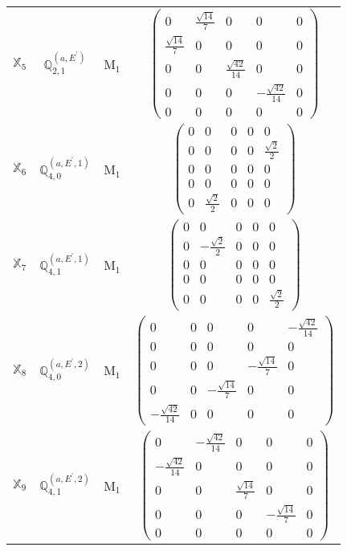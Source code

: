 \documentclass[fleqn,10pt,landscape]{article}
\begin{document}
\begin{itemize}
\begin{center}
\begin{longtable}{c|c|c|c}
$ \mathbb{X}_{5} $ & $\mathbb{Q}_{2,1}^{(a,E^{\prime})}$ & M$_{1}$ & $\begin{pmatrix} 0 & \frac{\sqrt{14}}{7} & 0 & 0 & 0 \\ \frac{\sqrt{14}}{7} & 0 & 0 & 0 & 0 \\ 0 & 0 & \frac{\sqrt{42}}{14} & 0 & 0 \\ 0 & 0 & 0 & - \frac{\sqrt{42}}{14} & 0 \\ 0 & 0 & 0 & 0 & 0 \end{pmatrix}$ \\
$ \mathbb{X}_{6} $ & $\mathbb{Q}_{4,0}^{(a,E^{\prime},1)}$ & M$_{1}$ & $\begin{pmatrix} 0 & 0 & 0 & 0 & 0 \\ 0 & 0 & 0 & 0 & \frac{\sqrt{2}}{2} \\ 0 & 0 & 0 & 0 & 0 \\ 0 & 0 & 0 & 0 & 0 \\ 0 & \frac{\sqrt{2}}{2} & 0 & 0 & 0 \end{pmatrix}$ \\
$ \mathbb{X}_{7} $ & $\mathbb{Q}_{4,1}^{(a,E^{\prime},1)}$ & M$_{1}$ & $\begin{pmatrix} 0 & 0 & 0 & 0 & 0 \\ 0 & - \frac{\sqrt{2}}{2} & 0 & 0 & 0 \\ 0 & 0 & 0 & 0 & 0 \\ 0 & 0 & 0 & 0 & 0 \\ 0 & 0 & 0 & 0 & \frac{\sqrt{2}}{2} \end{pmatrix}$ \\
$ \mathbb{X}_{8} $ & $\mathbb{Q}_{4,0}^{(a,E^{\prime},2)}$ & M$_{1}$ & $\begin{pmatrix} 0 & 0 & 0 & 0 & - \frac{\sqrt{42}}{14} \\ 0 & 0 & 0 & 0 & 0 \\ 0 & 0 & 0 & - \frac{\sqrt{14}}{7} & 0 \\ 0 & 0 & - \frac{\sqrt{14}}{7} & 0 & 0 \\ - \frac{\sqrt{42}}{14} & 0 & 0 & 0 & 0 \end{pmatrix}$ \\
$ \mathbb{X}_{9} $ & $\mathbb{Q}_{4,1}^{(a,E^{\prime},2)}$ & M$_{1}$ & $\begin{pmatrix} 0 & - \frac{\sqrt{42}}{14} & 0 & 0 & 0 \\ - \frac{\sqrt{42}}{14} & 0 & 0 & 0 & 0 \\ 0 & 0 & \frac{\sqrt{14}}{7} & 0 & 0 \\ 0 & 0 & 0 & - \frac{\sqrt{14}}{7} & 0 \\ 0 & 0 & 0 & 0 & 0 \end{pmatrix}$ \\

\end{longtable}
\end{center}
\end{itemize}
\end{document}
